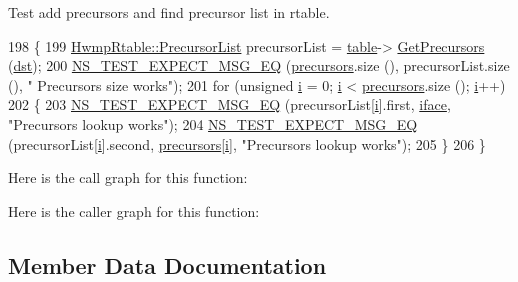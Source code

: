 Test add precursors and find precursor list in rtable. 


\begin{DoxyCode}
198 \{
199   \hyperlink{classns3_1_1dot11s_1_1HwmpRtable_a91366ab9155f7ff630c797a8d40262fc}{HwmpRtable::PrecursorList} precursorList = \hyperlink{classHwmpRtableTest_a2189a3cb5cad7f08c561dae58fee8a6a}{table}->
      \hyperlink{classns3_1_1dot11s_1_1HwmpRtable_a88e406b2cecdc86d1b87054454920e23}{GetPrecursors} (\hyperlink{classHwmpRtableTest_a1acc76986a88c36bbc037c166aa1b93e}{dst});
200   \hyperlink{group__testing_ga7304ba46a28d8cf08dfdfd6499cf7068}{NS\_TEST\_EXPECT\_MSG\_EQ} (\hyperlink{classHwmpRtableTest_a8ba7203ed0eb37c643b78cbf3a3aa8b5}{precursors}.size (), precursorList.size (), \textcolor{stringliteral}{"
      Precursors size works"});
201   \textcolor{keywordflow}{for} (\textcolor{keywordtype}{unsigned} \hyperlink{bernuolliDistribution_8m_a6f6ccfcf58b31cb6412107d9d5281426}{i} = 0; \hyperlink{bernuolliDistribution_8m_a6f6ccfcf58b31cb6412107d9d5281426}{i} < \hyperlink{classHwmpRtableTest_a8ba7203ed0eb37c643b78cbf3a3aa8b5}{precursors}.size (); \hyperlink{bernuolliDistribution_8m_a6f6ccfcf58b31cb6412107d9d5281426}{i}++)
202     \{
203       \hyperlink{group__testing_ga7304ba46a28d8cf08dfdfd6499cf7068}{NS\_TEST\_EXPECT\_MSG\_EQ} (precursorList[\hyperlink{bernuolliDistribution_8m_a6f6ccfcf58b31cb6412107d9d5281426}{i}].first, \hyperlink{classHwmpRtableTest_a2e1be779ea06d1ae0ac21d4462e5306b}{iface}, \textcolor{stringliteral}{"Precursors lookup
       works"});
204       \hyperlink{group__testing_ga7304ba46a28d8cf08dfdfd6499cf7068}{NS\_TEST\_EXPECT\_MSG\_EQ} (precursorList[\hyperlink{bernuolliDistribution_8m_a6f6ccfcf58b31cb6412107d9d5281426}{i}].second, 
      \hyperlink{classHwmpRtableTest_a8ba7203ed0eb37c643b78cbf3a3aa8b5}{precursors}[\hyperlink{bernuolliDistribution_8m_a6f6ccfcf58b31cb6412107d9d5281426}{i}], \textcolor{stringliteral}{"Precursors lookup works"});
205     \}
206 \}
\end{DoxyCode}


Here is the call graph for this function\+:




Here is the caller graph for this function\+:




\subsection{Member Data Documentation}

